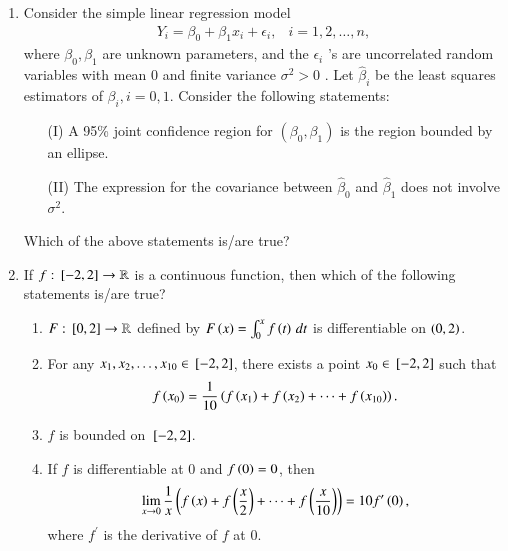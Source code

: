 \documentclass[journal,12pt,onecolumn]{IEEEtran}
\theoremstyle{remark}
\begin{document}
\begin{enumerate}
 \item Consider the simple linear regression model \begin{align} Y_i = \beta_0 + \beta_1 x_i + \epsilon_i, & i = 1,2, \dots, n,\end{align} where $\beta_0, \beta_1$ are unknown parameters, and the $\epsilon_i$ 's are uncorrelated random variables with mean 0 and finite variance $\sigma^2 > 0$ . Let $\hat{\beta}_i$ be the least squares estimators of $\beta_i, i = 0, 1$. Consider the following statements:

\begin{enumerate}
    \item[(I)] A 95\% joint confidence region for $(\beta_0, \beta_1)$ is the region bounded by an ellipse.
    \item[(II)] The expression for the covariance between $\hat{\beta}_0$ and $\hat{\beta}_1$ does not involve $\sigma^2$.
\end{enumerate}

Which of the above statements is/are true?

\begin{enumerate}
\end{enumerate}

\item If $f: {}\left[-2, 2\right] \rightarrow \mathbb{R}$ is a continuous function, then which of the following statements 
is/are true?

\begin{enumerate}
    \item $F: {}\left[0, 2\right] \rightarrow \mathbb{R} $ defined by $F\left(x\right) = \int_{0}^{x} f\left(t\right) \, dt$ is differentiable on $\left(0, 2\right)$.
    
    \item For any $x_1, x_2, \dots, x_{10} \in {}\left[-2, 2\right] $, there exists a point $x_{0} \in {}\left[-2, 2\right]$ such that 
    \[
    f\left(x_{0}\right) = \frac{1}{10} \left( f\left(x_1\right) + f\left(x_2\right) + \dots + f\left(x_{10}\right) \right).
    \]
    
    \item $f$ is bounded on ${}\left[-2, 2\right]$.
    
    \item If $f$ is differentiable at 0 and $f\left(0\right) = 0$, then 
    \[
    \lim_{x \to 0} \frac{1}{x} \left( f\left(x\right) + f\left(\frac{x}{2}\right) + \dots + f\left(\frac{x}{10}\right) \right) = 10 f^\prime \left(0\right),
    \]
    where $f^\prime$ is the derivative of $f$ at $0$.
\end{enumerate}




\end{enumerate}
\end{document}
